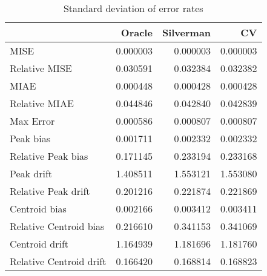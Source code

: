 \begin{table}[ht]
\centering
\begin{tabular}{lrrr}
  \hline
 & Oracle & Silverman & CV \\ 
  \hline
MISE & 0.000003 & 0.000003 & 0.000003 \\ 
  Relative MISE & 0.030591 & 0.032384 & 0.032382 \\ 
  MIAE & 0.000448 & 0.000428 & 0.000428 \\ 
  Relative MIAE & 0.044846 & 0.042840 & 0.042839 \\ 
  Max Error & 0.000586 & 0.000807 & 0.000807 \\ 
  Peak bias & 0.001711 & 0.002332 & 0.002332 \\ 
  Relative Peak bias & 0.171145 & 0.233194 & 0.233168 \\ 
  Peak drift & 1.408511 & 1.553121 & 1.553080 \\ 
  Relative Peak drift & 0.201216 & 0.221874 & 0.221869 \\ 
  Centroid bias & 0.002166 & 0.003412 & 0.003411 \\ 
  Relative Centroid bias & 0.216610 & 0.341153 & 0.341069 \\ 
  Centroid drift & 1.164939 & 1.181696 & 1.181760 \\ 
  Relative Centroid drift & 0.166420 & 0.168814 & 0.168823 \\ 
   \hline
\end{tabular}
\caption{Standard deviation of error rates} 
\label{tbl:stddev_error_rates}
\end{table}
